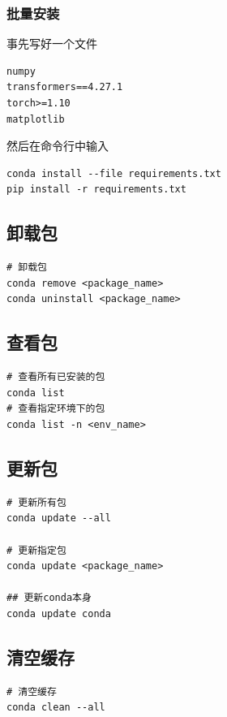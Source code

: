 \subsubsection{批量安装}
\label{subsubsec:install_package_batch}
事先写好一个文件
\begin{lstlisting}[style=demostyle,numbers=none]
numpy
transformers==4.27.1
torch>=1.10
matplotlib
\end{lstlisting}    

然后在命令行中输入
\begin{lstlisting}[style=demostyle,numbers=none]
conda install --file requirements.txt
pip install -r requirements.txt
\end{lstlisting}

\subsection{卸载包}
\label{subsubsec:use_conda_package_remove}
\begin{lstlisting}[style=demostyle,numbers=none]
# 卸载包
conda remove <package_name>
conda uninstall <package_name>
\end{lstlisting}

\subsection{查看包}
\label{subsubsec:use_conda_package_list}
\begin{lstlisting}[style=demostyle,numbers=none]
# 查看所有已安装的包
conda list
# 查看指定环境下的包
conda list -n <env_name>
\end{lstlisting}

\subsection{更新包}
\label{subsubsec:use_conda_package_update}
\begin{lstlisting}[style=demostyle,numbers=none]
# 更新所有包
conda update --all

# 更新指定包
conda update <package_name>

## 更新conda本身
conda update conda
\end{lstlisting}

\subsection{清空缓存}
\label{subsubsec:use_conda_package_clean}
\begin{lstlisting}[style=demostyle,numbers=none]
# 清空缓存
conda clean --all
\end{lstlisting}


